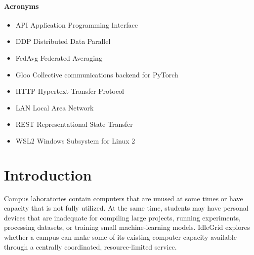\documentclass{article}
\begin{document}
	\pagebreak
	
	
	\renewcommand{\contentsname}{\textbf{Table Of Contents} }
	\renewcommand{\cfttoctitlefont}{\huge}
	\tableofcontents\thispagestyle{fancy}
	\setlength{\parindent}{4em}
	\setlength{\parskip}{1em}
	\renewcommand{\baselinestretch}{2.0}
	
\listoffigures
\pagebreak
\listoftables
\pagebreak
	\paragraph{Acronyms}
	\begin{itemize}
		\item API \hspace{5em}Application Programming Interface
		\item DDP \hspace{5em}Distributed Data Parallel
		\item FedAvg \hspace{5em}Federated Averaging
		\item Gloo \hspace{5em}Collective communications backend for PyTorch
		\item HTTP \hspace{5em}Hypertext Transfer Protocol
		\item LAN \hspace{5em}Local Area Network
		\item REST \hspace{5em}Representational State Transfer
		\item WSL2 \hspace{5em}Windows Subsystem for Linux 2
		
	\end{itemize}
		
	\pagebreak
	\section{Introduction}
    
Campus laboratories contain computers that are unused at some times or have capacity that is not fully utilized. At the same time, students may have personal devices that are inadequate for compiling large projects, running experiments, processing datasets, or training small machine-learning models. IdleGrid explores whether a campus can make some of its existing computer capacity available through a centrally coordinated, resource-limited service.
\end{document}
